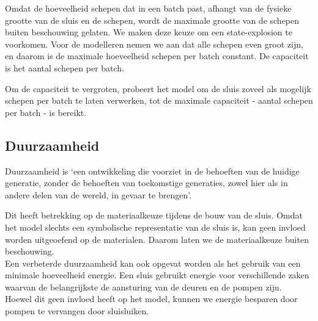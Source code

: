 \documentclass{article} %
\begin{document}
Omdat de hoeveelheid schepen dat in een batch past, afhangt van de fysieke grootte van de sluis en de schepen, wordt de maximale grootte van de schepen buiten beschouwing gelaten. We maken deze keuze om een state-explosion te voorkomen.
Voor de modelleren nemen we aan dat alle schepen even groot zijn, en daarom is de maximale hoeveelheid schepen per batch constant. De capaciteit is het aantal schepen per batch. \par
Om de capaciteit te vergroten, probeert het model om de sluis zoveel als mogelijk schepen per batch te laten verwerken, tot de maximale capaciteit - aantal schepen per batch - is bereikt. \par
\newpage

\subsection{Duurzaamheid}
Duurzaamheid is ‘een ontwikkeling die voorziet in de behoeften van de huidige generatie, zonder de behoeften van toekomstige generaties, zowel hier als in andere delen van de wereld, in gevaar te brengen’. \cite{CBSduurzaamheid} \par

Dit heeft betrekking op de materiaalkeuze tijdens de bouw van de sluis. Omdat het model slechts een symbolische representatie van de sluis is, kan geen invloed worden uitgeoefend op de materialen. Daarom laten we de materiaalkeuze buiten beschouwing. \\
Een verbeterde duurzaamheid kan ook opgevat worden als het gebruik van een minimale hoeveelheid energie. Een sluis gebruikt energie voor verschillende zaken waarvan de belangrijkste de aansturing van de deuren en de pompen zijn. \\
Hoewel dit geen invloed heeft op het model, kunnen we energie besparen door pompen te vervangen door sluisluiken.
\end{document}
